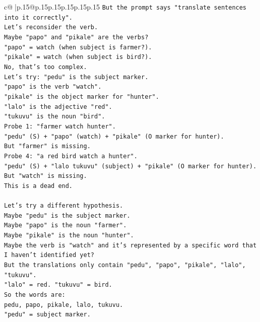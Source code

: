 \documentclass{article}
\begin{document}
{\begin{supertabular}{c@{$\;$}|p{.15\linewidth}@{}p{.15\linewidth}p{.15\linewidth}p{.15\linewidth}p{.15\linewidth}p{.15\linewidth}}
{{{\texttt{But the prompt says "translate sentences into it correctly".} \\
\texttt{Let's reconsider the verb.} \\
\texttt{Maybe "papo" and "pikale" are the verbs?} \\
\texttt{"papo" = watch (when subject is farmer?).} \\
\texttt{"pikale" = watch (when subject is bird?).} \\
\texttt{No, that's too complex.} \\
\texttt{Let's try: "pedu" is the subject marker.} \\
\texttt{"papo" is the verb "watch".} \\
\texttt{"pikale" is the object marker for "hunter".} \\
\texttt{"lalo" is the adjective "red".} \\
\texttt{"tukuvu" is the noun "bird".} \\
\texttt{Probe 1: "farmer watch hunter".} \\
\texttt{"pedu" (S) + "papo" (watch) + "pikale" (O marker for hunter).} \\
\texttt{But "farmer" is missing.} \\
\texttt{Probe 4: "a red bird watch a hunter".} \\
\texttt{"pedu" (S) + "lalo tukuvu" (subject) + "pikale" (O marker for hunter).} \\
\texttt{But "watch" is missing.} \\
\texttt{This is a dead end.} \\
\\ 
\texttt{Let's try a different hypothesis.} \\
\texttt{Maybe "pedu" is the subject marker.} \\
\texttt{Maybe "papo" is the noun "farmer".} \\
\texttt{Maybe "pikale" is the noun "hunter".} \\
\texttt{Maybe the verb is "watch" and it's represented by a specific word that I haven't identified yet?} \\
\texttt{But the translations only contain "pedu", "papo", "pikale", "lalo", "tukuvu".} \\
\texttt{"lalo" = red. "tukuvu" = bird.} \\
\texttt{So the words are:} \\
\texttt{pedu, papo, pikale, lalo, tukuvu.} \\
\texttt{"pedu" = subject marker.} \\
}}}
\end{supertabular}}
\end{document}
